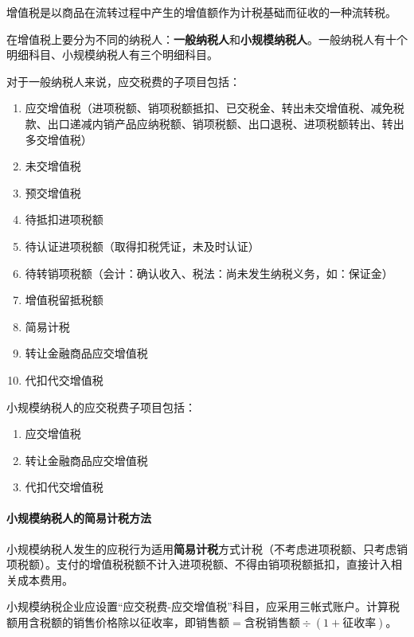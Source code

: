 \documentclass[UTF8,12pt]{ctexart}
\numberwithin{equation}{section} %
\numberwithin{figure}{section}
\numberwithin{table}{section}
\begin{document}
	增值税是以商品在流转过程中产生的增值额作为计税基础而征收的一种流转税。
	
	在增值税上要分为不同的纳税人：\textbf{一般纳税人}和\textbf{小规模纳税人}。一般纳税人有十个明细科目、小规模纳税人有三个明细科目。
	
	对于一般纳税人来说，应交税费的子项目包括：
	\begin{enumerate}
		\item 应交增值税（进项税额、销项税额抵扣、已交税金、转出未交增值税、减免税款、出口递减内销产品应纳税额、销项税额、出口退税、进项税额转出、转出多交增值税）
		
		\item 未交增值税
		
		\item 预交增值税
		
		\item 待抵扣进项税额
		
		\item 待认证进项税额（取得扣税凭证，未及时认证）
		
		\item 待转销项税额（会计：确认收入、税法：尚未发生纳税义务，如：保证金）
		
		\item 增值税留抵税额
		
		\item 简易计税
		
		\item 转让金融商品应交增值税
		
		\item 代扣代交增值税
	\end{enumerate}
	
	小规模纳税人的应交税费子项目包括：
	\begin{enumerate}
		\item 应交增值税
		
		\item 转让金融商品应交增值税
		
		\item 代扣代交增值税
	\end{enumerate}
	
	\paragraph{小规模纳税人的简易计税方法}
	小规模纳税人发生的应税行为适用\textbf{简易计税}方式计税（不考虑进项税额、只考虑销项税额）。支付的增值税税额不计入进项税额、不得由销项税额抵扣，直接计入相关成本费用。
	
	小规模纳税企业应设置“应交税费-应交增值税”科目，应采用三帐式账户。计算税额用含税额的销售价格除以征收率，即$\text{销售额} = \text{含税销售额} \div (1+\text{征收率})$。
	
\end{document}
